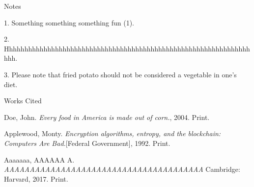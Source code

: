 \documentclass[12pt]{article}
\newcommand{\bibent}{\noindent \hangindent 40pt}
\newenvironment{workscited}{\newpage \begin{center} Works Cited \end{center}}{\newpage }
\begin{document}
\begin{flushleft}
\begin{center}
Notes
\end{center}


\setlength{\parindent}{0.5in}

1. Something something something fun (1).


2. Hhhhhhhhhhhhhhhhhhhhhhhhhhhhhhhhhhhhhhhhhhhhhhhhhhhhhhhhhhhhhhhhhhh.


3. Please note that fried potato should not be considered a vegetable in one's diet.

\begin{workscited}

\bibent
Doe, John. \textit{Every food in America is made out of corn.}, 2004. Print.

\bibent
Applewood, Monty. \textit{Encryption algorithms, entropy, and the blockchain: Computers Are Bad.}[Federal Government], 1992. Print.

\bibent
Aaaaaaa, AAAAAA A. \textit{AAAAAAAAAAAAAAAAAAAAAAAAAAAAAAAAAAAAAAA} Cambridge: Harvard, 2017. Print.


\end{workscited}

\end{flushleft}
\end{document}
